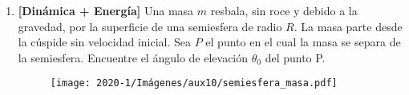 \documentclass[letterpaper,11pt]{article}
\begin{document}
\begin{enumerate}
\item \textbf{[Dinámica + Energía]} Una masa $m$ resbala, sin roce y debido a la gravedad, por la superficie de una semiesfera de radio $R$. La masa parte desde la cúspide sin velocidad inicial. Sea $P$ el punto en el cual la masa se separa de la semiesfera. Encuentre el ángulo de elevación $\theta_0$ del punto P.

\begin{figure}[h!]
    \centering
    \texttt{[image: 2020-1/Imágenes/aux10/semiesfera\_masa.pdf]}
\end{figure}

%   

\end{enumerate}
\end{document}
